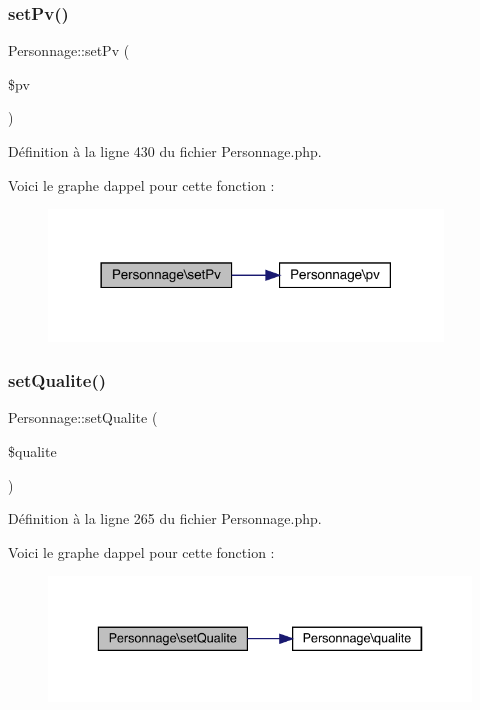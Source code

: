 \subsubsection{\texorpdfstring{set\+Pv()}{setPv()}}
{\footnotesize\ttfamily Personnage\+::set\+Pv (\begin{DoxyParamCaption}\item[{}]{\$pv }\end{DoxyParamCaption})}



Définition à la ligne 430 du fichier Personnage.\+php.

Voici le graphe d\textquotesingle{}appel pour cette fonction \+:\nopagebreak
\begin{figure}[H]
\begin{center}
\leavevmode
\includegraphics[width=297pt]{class_personnage_ab0106674504168da06bff966c9000ffb_cgraph}
\end{center}
\end{figure}
\mbox{\label{class_personnage_a85bad8be1af1855b0c736d84640ec820}} 
\subsubsection{\texorpdfstring{set\+Qualite()}{setQualite()}}
{\footnotesize\ttfamily Personnage\+::set\+Qualite (\begin{DoxyParamCaption}\item[{}]{\$qualite }\end{DoxyParamCaption})}



Définition à la ligne 265 du fichier Personnage.\+php.

Voici le graphe d\textquotesingle{}appel pour cette fonction \+:\nopagebreak
\begin{figure}[H]
\begin{center}
\leavevmode
\includegraphics[width=336pt]{class_personnage_a85bad8be1af1855b0c736d84640ec820_cgraph}
\end{center}
\end{figure}
\mbox{\label{class_personnage_a9e07b4d56c5b54669cb6184b4b4a46c1}} 
